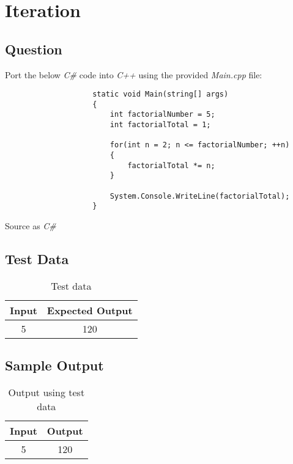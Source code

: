 \documentclass[main.tex]{subfiles}
\begin{document}
    \section{Iteration}
        \subsection{Question}
        Port the below \textit{C\#} code into \textit{C++} using the provided \textit{Main.cpp} file:
            \begin{listing}[H]
                \begin{verbatim}
                    static void Main(string[] args)
                    {
                        int factorialNumber = 5;
                        int factorialTotal = 1;

                        for(int n = 2; n <= factorialNumber; ++n)
                        {
                            factorialTotal *= n;
                        }

                        System.Console.WriteLine(factorialTotal);
                    }
                \end{verbatim}
                \caption{Source as \textit{C\#}}
            \end{listing}

        \subsection{Test Data}
            \begin{table}[H]
                \centering
                \begin{tabular}{c c}
                    \hline
                    \textbf{Input} & \textbf{Expected Output} \\
                    \hline
                    5 & 120 \\
                    \hline
                \end{tabular}
                \caption{Test data}
            \end{table}
        
        \subsection{Sample Output}
            \begin{table}[H]
                \centering
                \begin{tabular}{c c}
                    \hline
                    \textbf{Input} & \textbf{Output} \\
                    \hline
                    5 & 120 \\
                    \hline
                \end{tabular}
                \caption{Output using test data}
            \end{table}
\end{document}
